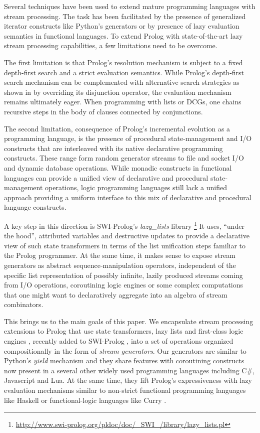 \documentclass{new_tlp}
\begin{document}
Several techniques have been used to extend mature programming languages with stream processing. The task has been facilitated by the presence of generalized iterator constructs like Python's generators or by presence of lazy evaluation semantics in functional languages. To extend Prolog with state-of-the-art lazy stream processing capabilities, a few limitations need to be overcome.

The first limitation is that Prolog's resolution mechanism is subject to a fixed depth-first search and a strict evaluation semantics.
While Prolog's depth-first  search mechanism can be complemented with alternative search strategies as shown in \cite{tor} by overriding its disjunction operator, the evaluation mechanism remains ultimately eager. When programming with lists or DCGs, one chains recursive steps
in the body of clauses connected by conjunctions. 

The second limitation, consequence of Prolog's incremental evolution as a programming language, is the presence of procedural state-management and I/O constructs that are
interleaved with its native declarative programming constructs. These range form 
random generator streams to file and socket I/O and dynamic database operations.
While monadic constructs in functional languages \cite{moggi:monads,wadler93:cont}  can provide  a unified view of declarative and procedural state-management operations, logic programming languages still lack a unified approach providing a uniform interface to 
this mix of declarative and procedural language constructs.

A key step in this direction is SWI-Prolog's \cite{swi} 
{\em lazy\_lists} library
\footnote{\url{http://www.swi-prolog.org/pldoc/doc/_SWI_/library/lazy_lists.pl}}
 It uses, ``under the hood'', attributed variables and destructive updates  to provide a declarative view of such state transformers in terms of the list unification steps familiar to the Prolog programmer. 
At the same time, it makes sense to expose stream generators as abstract sequence-manipulation operators, independent of the specific list representation of
possibly infinite, lazily produced streams coming from I/O operations, coroutining logic engines or some complex computations that one might want to declaratively aggregate into an algebra of stream combinators.


This brings us to the main goals of this paper. 
We encapsulate stream processing extensions to Prolog that use
state transformers, lazy lists and first-class logic engines 
\cite{tarau:cl2000,bp2011}, recently added to SWI-Prolog \cite{swi_engines},
into a set of operations organized compositionally in the form of {\em 
stream generators}.
Our generators are similar to Python's {\em yield} mechanism \cite{beazley09} and 
they share features with coroutining constructs now present in a several other widely used programming languages including C\#, Javascript and Lua. At the same time, 
they lift Prolog's expressiveness with lazy evaluation mechanisms similar to non-strict
functional programming languages like Haskell \cite{hudak07} or functional-logic languages like Curry \cite{antoy05}.
\end{document}
